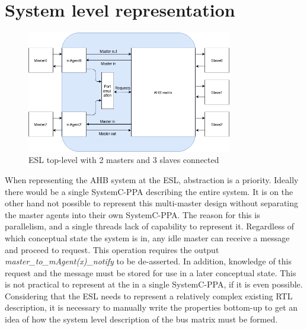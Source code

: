 \section{System level representation}
\label{sec:syslev}
\begin{figure}[hbt]
    \begin{center}
        \includegraphics[width=0.8\textwidth]{figs/ESL/Syslev.png}
    \end{center}
    \caption{ESL top-level with 2 masters and 3 slaves connected}
    \label{fig:esl_toplev}
\end{figure}

When representing the AHB system at the ESL, abstraction is a priority. Ideally there would be a single SystemC-PPA describing the entire system. It is on 
the other hand not possible to represent this multi-master design without separating the master agents into their own SystemC-PPA. The reason for this is 
parallelism, and a single threads lack of capability to represent it. Regardless of which conceptual state the system is in, any idle master can receive 
a message and proceed to request. This operation requires the output \textit{master\_to\_mAgent(x)\_notify} to be de-asserted. In addition, knowledge of this request and the message must be stored for use in a later conceptual state. This is not practical to represent at the in a single SystemC-PPA, if it is even possible. \\
Considering that the ESL needs to represent a relatively complex existing RTL description, it is necessary to manually write the properties bottom-up to get an idea of how the system level description of the bus matrix must be formed.

